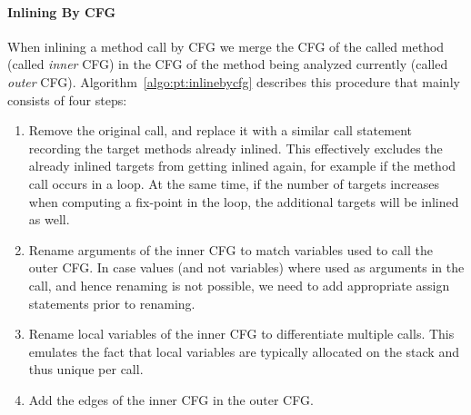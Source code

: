 \documentclass[a4paper]{article}
\begin{document}
\paragraph{Inlining By CFG}
When inlining a method call by CFG we merge the CFG of the called method
(called \emph{inner} CFG) in the CFG of the method being analyzed currently (called
\emph{outer} CFG). Algorithm~\ref{algo:pt:inlinebycfg} describes this procedure that
mainly consists of four steps:

\begin{enumerate}
    \item Remove the original call, and replace it with a similar call
    statement recording the target methods already inlined. This effectively
    excludes the already inlined targets from getting inlined again, for
    example if the method call occurs in a loop. At the same time, if the
    number of targets increases when computing a fix-point in the loop, the
    additional targets will be inlined as well.

    \item Rename arguments of the inner CFG to match variables used to call the
    outer CFG. In case values (and not variables) where used as arguments in
    the call, and hence renaming is not possible, we need to add appropriate
    assign statements prior to renaming.

    \item Rename local variables of the inner CFG to differentiate multiple
    calls. This emulates the fact that local variables are typically allocated
    on the stack and thus unique per call.

    \item Add the edges of the inner CFG in the outer CFG.
\end{enumerate}
\end{document}
